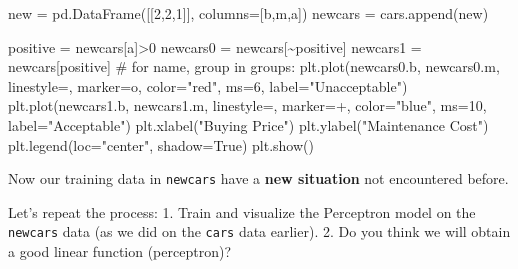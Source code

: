 \documentclass[
  letterpaper,
]{scrbook}
\newenvironment{Shaded}{\begin{snugshade}}{\end{snugshade}}
\newcommand{\CommentTok}[1]{\textcolor[rgb]{0.37,0.37,0.37}{#1}}
\newcommand{\DecValTok}[1]{\textcolor[rgb]{0.68,0.00,0.00}{#1}}
\newcommand{\NormalTok}[1]{\textcolor[rgb]{0.00,0.23,0.31}{#1}}
\newcommand{\OperatorTok}[1]{\textcolor[rgb]{0.37,0.37,0.37}{#1}}
\newcommand{\StringTok}[1]{\textcolor[rgb]{0.13,0.47,0.30}{#1}}
\newcommand{\VariableTok}[1]{\textcolor[rgb]{0.07,0.07,0.07}{#1}}
\begin{document}
\begin{Shaded}
\begin{Highlighting}[]
\NormalTok{new }\OperatorTok{=}\NormalTok{ pd.DataFrame([[}\DecValTok{2}\NormalTok{,}\DecValTok{2}\NormalTok{,}\DecValTok{1}\NormalTok{]], columns}\OperatorTok{=}\NormalTok{[}\StringTok{\textquotesingle{}b\textquotesingle{}}\NormalTok{,}\StringTok{\textquotesingle{}m\textquotesingle{}}\NormalTok{,}\StringTok{\textquotesingle{}a\textquotesingle{}}\NormalTok{])}
\NormalTok{newcars }\OperatorTok{=}\NormalTok{ cars.append(new)}

\NormalTok{positive }\OperatorTok{=}\NormalTok{ newcars[}\StringTok{\textquotesingle{}a\textquotesingle{}}\NormalTok{]}\OperatorTok{\textgreater{}}\DecValTok{0}
\NormalTok{newcars0 }\OperatorTok{=}\NormalTok{ newcars[}\OperatorTok{\textasciitilde{}}\NormalTok{positive]}
\NormalTok{newcars1 }\OperatorTok{=}\NormalTok{ newcars[positive]}
\CommentTok{\# for name, group in groups: }
\NormalTok{plt.plot(newcars0.b, newcars0.m, linestyle}\OperatorTok{=}\StringTok{\textquotesingle{}\textquotesingle{}}\NormalTok{, marker}\OperatorTok{=}\StringTok{\textquotesingle{}o\textquotesingle{}}\NormalTok{, }
\NormalTok{         color}\OperatorTok{=}\StringTok{"red"}\NormalTok{, ms}\OperatorTok{=}\DecValTok{6}\NormalTok{, label}\OperatorTok{=}\StringTok{"Unacceptable"}\NormalTok{)}
\NormalTok{plt.plot(newcars1.b, newcars1.m, linestyle}\OperatorTok{=}\StringTok{\textquotesingle{}\textquotesingle{}}\NormalTok{, marker}\OperatorTok{=}\StringTok{\textquotesingle{}+\textquotesingle{}}\NormalTok{, }
\NormalTok{         color}\OperatorTok{=}\StringTok{"blue"}\NormalTok{, ms}\OperatorTok{=}\DecValTok{10}\NormalTok{, label}\OperatorTok{=}\StringTok{"Acceptable"}\NormalTok{)}
\NormalTok{plt.xlabel(}\StringTok{"Buying Price"}\NormalTok{)}
\NormalTok{plt.ylabel(}\StringTok{"Maintenance Cost"}\NormalTok{)}
\NormalTok{plt.legend(loc}\OperatorTok{=}\StringTok{"center"}\NormalTok{, shadow}\OperatorTok{=}\VariableTok{True}\NormalTok{)}
\NormalTok{plt.show()}
\end{Highlighting}
\end{Shaded}

Now our training data in \texttt{newcars} have a \textbf{new situation}
not encountered before.

Let's repeat the process: 1. Train and visualize the Perceptron model on
the \texttt{newcars} data (as we did on the \texttt{cars} data earlier).
2. Do you think we will obtain a good linear function (perceptron)?
\end{document}
